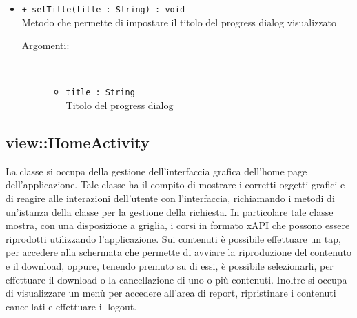 \documentclass[../Tesi.tex]{subfiles}
\begin{document}
\begin{description}
\begin{itemize}
				\item \texttt{+ setTitle(title : String) : void}\\
				Metodo che permette di impostare il titolo del progress dialog visualizzato
				\begin{description}
					\item[Argomenti:] \
					\begin{itemize}
						\item \texttt{title : String}\\
						Titolo del progress dialog
					\end{itemize}
				\end{description}
			\end{itemize}
		\end{description}

		\subsection{view::HomeActivity}
		La classe  si occupa della gestione dell'interfaccia grafica dell'home page dell'applicazione. Tale classe ha il compito di mostrare i corretti oggetti grafici e di reagire alle interazioni dell'utente con l'interfaccia, richiamando i metodi di un'istanza della classe  per la gestione della richiesta. In particolare tale classe mostra, con una disposizione a griglia, i corsi in formato xAPI che possono essere riprodotti utilizzando l'applicazione. Sui contenuti è possibile effettuare un tap, per accedere alla schermata che permette di avviare la riproduzione del contenuto e il download, oppure, tenendo premuto su di essi, è possibile selezionarli, per effettuare il download o la cancellazione di uno o più contenuti. Inoltre si occupa di visualizzare un menù per accedere all'area di report, ripristinare i contenuti cancellati e effettuare il logout.
\end{document}
